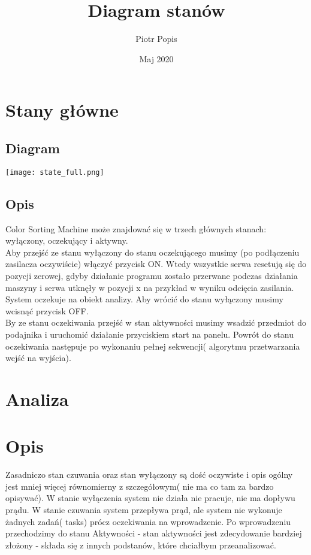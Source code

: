 \documentclass[13pt]{article}
\title{Diagram stanów}
\author{Piotr Popis}
\date{Maj 2020}
\begin{document}
\begin{titlepage}
\maketitle
\end{titlepage}
\section{Stany główne}
\subsection{Diagram}
\hspace*{-3.5cm}                                                           
\texttt{[image: state\_full.png]}
\subsection{Opis}
Color Sorting Machine może znajdować się w trzech głównych stanach: wyłączony, oczekujący i aktywny. \\
 \hspace*{1cm} Aby przejść ze stanu wyłączony do stanu oczekującego musimy (po podłączeniu zasilacza oczywiście) włączyć przycisk ON. Wtedy wszystkie serwa resetują się do pozycji zerowej, gdyby działanie programu zostało przerwane podczas działania maszyny i serwa utknęły w pozycji x na przykład w wyniku odcięcia zasilania. System oczekuje na obiekt analizy. Aby wrócić do stanu wyłączony musimy wcisnąć przycisk OFF.\\
\hspace*{1cm}
By ze stanu oczekiwania przejść w stan aktywności musimy wsadzić przedmiot do podajnika i uruchomić działanie przyciskiem start na panelu. Powrót do stanu oczekiwania następuje po wykonaniu pełnej sekwencji( algorytmu przetwarzania wejść na wyjścia).\\
\section{Analiza}
\section{Opis}
Zasadniczo stan czuwania oraz stan wyłączony są dość oczywiste i opis ogólny jest mniej więcej równomierny z szczegółowym( nie ma co tam za bardzo opisywać). W stanie wyłączenia system nie działa nie pracuje, nie ma dopływu prądu. W stanie czuwania system przepływa prąd, ale system nie wykonuje żadnych zadań( tasks) prócz oczekiwania na wprowadzenie. Po wprowadzeniu przechodzimy do stanu Aktywności - stan aktywności jest zdecydowanie bardziej złożony - składa się z innych podstanów, które chciałbym przeanalizować.
\end{document}
